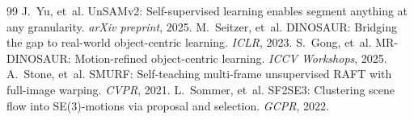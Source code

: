 \documentclass{article}
\begin{document}
\begin{thebibliography}{99}
 J.~Yu, et~al. UnSAMv2: Self-supervised learning enables segment anything at any granularity. \emph{arXiv preprint}, 2025.
 M.~Seitzer, et~al. DINOSAUR: Bridging the gap to real-world object-centric learning. \emph{ICLR}, 2023.
 S.~Gong, et~al. MR-DINOSAUR: Motion-refined object-centric learning. \emph{ICCV Workshops}, 2025.
 A.~Stone, et~al. SMURF: Self-teaching multi-frame unsupervised RAFT with full-image warping. \emph{CVPR}, 2021.
 L.~Sommer, et~al. SF2SE3: Clustering scene flow into SE(3)-motions via proposal and selection. \emph{GCPR}, 2022.
\end{thebibliography}
\end{document}
